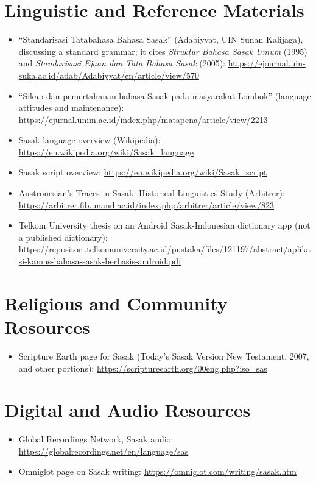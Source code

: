 \documentclass[12pt]{article}
\begin{document}
\section{Linguistic and Reference Materials}
\begin{itemize}
\item ``Standarisasi Tatabahasa Bahasa Sasak'' (Adabiyyat, UIN Sunan Kalijaga), discussing a standard grammar; it cites \emph{Struktur Bahasa Sasak Umum} (1995) and \emph{Standarisasi Ejaan dan Tata Bahasa Sasak} (2005): \url{https://ejournal.uin-suka.ac.id/adab/Adabiyyat/en/article/view/570}
\item ``Sikap dan pemertahanan bahasa Sasak pada masyarakat Lombok'' (language attitudes and maintenance): \url{https://ejurnal.unim.ac.id/index.php/matapena/article/view/2213}
\item Sasak language overview (Wikipedia): \url{https://en.wikipedia.org/wiki/Sasak_language}
\item Sasak script overview: \url{https://en.wikipedia.org/wiki/Sasak_script}
\item Austronesian's Traces in Sasak: Historical Linguistics Study (Arbitrer): \url{https://arbitrer.fib.unand.ac.id/index.php/arbitrer/article/view/823}
\item Telkom University thesis on an Android Sasak-Indonesian dictionary app (not a published dictionary): \url{https://repositori.telkomuniversity.ac.id/pustaka/files/121197/abstract/aplikasi-kamus-bahasa-sasak-berbasis-android.pdf}
\end{itemize}

\section{Religious and Community Resources}
\begin{itemize}
\item Scripture Earth page for Sasak (Today's Sasak Version New Testament, 2007, and other portions): \url{https://scriptureearth.org/00eng.php?iso=sas}
\end{itemize}

\section{Digital and Audio Resources}
\begin{itemize}
\item Global Recordings Network, Sasak audio: \url{https://globalrecordings.net/en/language/sas}
\item Omniglot page on Sasak writing: \url{https://omniglot.com/writing/sasak.htm}
\end{itemize}
\end{document}
